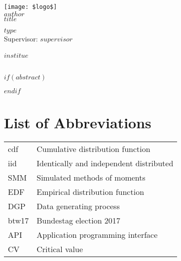 \documentclass[a4paper, bibtotocnumbered,liststotoc,12pt]{scrartcl}
\theoremstyle{definition}
\theoremstyle{remark}
\numberwithin{figure}{section}
\numberwithin{table}{section}
\numberwithin{equation}{section}
\begin{document}
\setcounter{page}{0}
\begin{titlepage}
\begin{center}
\texttt{[image: \$logo\$]}\\
\vspace{\fill}
\large{$author$}\\
\Huge{$title$}
\end{center}
\vspace{\fill}
\large{$type$} \\
\large{Supervisor: $supervisor$}\\
\vspace{\fill}\\ 
$institue$\\
\\
\end{titlepage}



$if(abstract)$
  \begin{abstract}
  $abstract$
  \end{abstract}
$endif$




\newpage %
\tableofcontents %
\newpage
\thispagestyle{plain}
\listoffigures %
\listoftables %
\listofalgorithms
{}


\section*{List of Abbreviations}
\begin{tabular}{ll}
	cdf & Cumulative distribution function\\
	iid & Identically and independent distributed\\
	SMM & Simulated methods of moments\\
	EDF & Empirical distribution function\\
	DGP & Data generating process \\
	btw17 & Bundestag election 2017 \\
	API & Application programming interface\\
	CV & Critical value
\end{tabular}
\newpage

\end{document}
